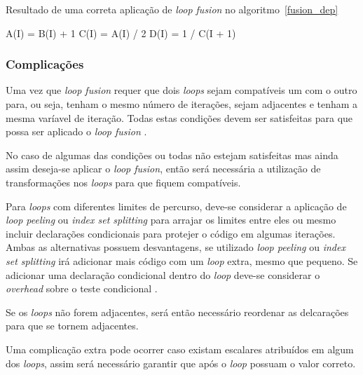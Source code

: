 \begin{algorithm}
\caption{Resultado de uma correta aplicação de \textit{loop fusion} no 
        algoritmo~\ref{fusion_dep}} 
\label{fusion_dep3}
\begin{algorithmic}[1]

\STATE A(I) = B(I) + 1
\STATE C(I) = A(I) / 2
\ENDFOR
{}
\STATE D(I) = 1 / C(I + 1)
\ENDFOR

\end{algorithmic}
\end{algorithm}


\subsubsection{Complicações}

Uma vez que \textit{loop fusion} requer que dois \textit{loops} sejam
compatíveis um com o outro para, ou seja, tenham o mesmo número de iterações,
sejam adjacentes e tenham a mesma varíavel de iteração.
Todas estas condições devem ser satisfeitas para que possa ser aplicado o
\textit{loop fusion} \cite{Wolf:1996}.

No caso de algumas das condições ou todas não estejam satisfeitas mas ainda
assim deseja-se aplicar o \textit{loop fusion}, então será necessária a
utilização de transformações nos \textit{loops} para que fiquem compatíveis.

Para \textit{loops} com diferentes limites de percurso, deve-se considerar a
aplicação de \textit{loop peeling} ou \textit{index set splitting} para arrajar
os limites entre eles ou mesmo incluir declarações condicionais para protejer o
código em algumas iterações.
Ambas as alternativas possuem desvantagens, se utilizado \textit{loop peeling}
ou \textit{index set splitting} irá adicionar mais código com um \textit{loop}
extra, mesmo que pequeno. Se adicionar uma declaração condicional dentro do
\textit{loop} deve-se considerar o \textit{overhead} sobre o teste condicional
\cite{hpcfpc}.

Se os \textit{loops} não forem adjacentes, será então necessário reordenar as
delcarações para que se tornem adjacentes.

Uma complicação extra pode ocorrer caso existam escalares atribuídos em algum
dos \textit{loops}, assim será necessário garantir que após o \textit{loop}
possuam o valor correto.


